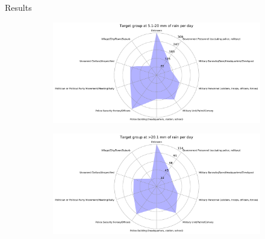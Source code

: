 \documentclass{beamer}
\begin{document}
\begin{frame}{Results}
\begin{figure}
\begin{subfigure}[b]{0.3\textwidth}
		\end{subfigure}
	\end{figure}
	\begin{figure}
		\begin{subfigure}[b]{0.3\textwidth}
			\includegraphics[width=\textwidth]{Rain-Target/rain51-20_starDiagram}
		\end{subfigure}
		\begin{subfigure}[b]{0.3\textwidth}
			\includegraphics[width=\textwidth]{Rain-Target/rain>201_starDiagram}
		\end{subfigure}
	\end{figure}
	
\end{frame}
\end{document}
